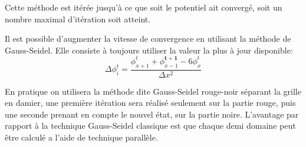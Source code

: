 Cette méthode est itérée jusqu'à ce que soit le potentiel ait convergé, soit un nombre maximal d'itération soit atteint.

Il est possible d'augmenter la vitesse de convergence en utilisant la méthode de Gauss-Seidel.
Elle consiste à toujours utiliser la valeur la plus à jour disponible:
\begin{equation}
\Delta \phi_i^t = \dfrac{\phi_{x+1}^t  + \phi_{x-1}^\mathbf{t+1}- 6\phi_{x}^t}{\Delta x ^2}
\end{equation}

En pratique on utilisera la méthode dite Gauss-Seidel rouge-noir séparant la grille en damier, une première itération sera réalisé seulement sur la partie rouge, puis une seconde prenant en compte le nouvel état, sur la partie noire.
L'avantage par rapport à la technique Gauss-Seidel classique est que chaque demi domaine peut être calculé a l'aide de technique parallèle.

